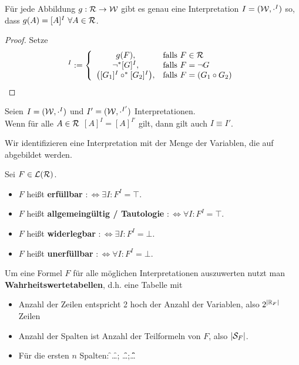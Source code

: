 \begin{proposition}\label{proposition3.10}
	Für jede Abbildung $g:\RR\to\W$ gibt es genau eine Interpretation $I=(\W,\cdot^I)$ so, dass $g(A)=[A]^I~\forall A\in\RR$.
\end{proposition}

\begin{proof}
	Setze
	\begin{align*}
		[F]^I:=\left\lbrace\begin{array}{cl}
			g(F),&\falls F\in\RR\\			
			\neg^\ast[G]^I, &\falls F=\neg G\\
			\big([G_1]^I\circ^\ast[G_2]^I\big),&\falls F=(G_1\circ G_2)
		\end{array}\right.
	\end{align*}
\end{proof}

\begin{proposition}\label{proposition3.11}
	Seien $I=(\W,\cdot^I)$ und $I'=(\W,\cdot^{I'})$ Interpretationen.\\
	Wenn für alle $A\in\RR$ $[A]^I=[A]^{I'}$ gilt, dann gilt auch $I\equiv I'$.
\end{proposition}

Wir identifizieren eine Interpretation mit der Menge der Variablen, die auf \w~ abgebildet werden.

\begin{definition}\label{def3.12}
	Sei $F\in\L(\RR)$.
	\begin{itemize}
		\item $F$ heißt \textbf{erfüllbar} $:\Longleftrightarrow\exists I:F^I=\top$.
		\item $F$ heißt \textbf{allgemeingültig / Tautologie} $:\Longleftrightarrow\forall I:F^I=\top$.
		\item $F$ heißt \textbf{widerlegbar} $:\Longleftrightarrow\exists I:F^I=\bot$.
		\item $F$ heißt \textbf{unerfüllbar} $:\Longleftrightarrow\forall I:F^I=\bot$.
	\end{itemize}
\end{definition}

Um eine Formel $F$ für alle möglichen Interpretationen auszuwerten nutzt man \textbf{Wahrheitswertetabellen}, d.h. eine Tabelle mit 
\begin{itemize}
	\item Anzahl der Zeilen entspricht 2 hoch der Anzahl der Variablen, also $2^{|\R_F|}$ Zeilen
	\item Anzahl der Spalten ist Anzahl der Teilformeln von $F$, also $|\S_F|$.
	\item Für die ersten $n$ Spalten: \w\f\w\f\ldots; \w\w\f\f\ldots;\w\w\w\w\f\f\f\f\ldots
\end{itemize}

